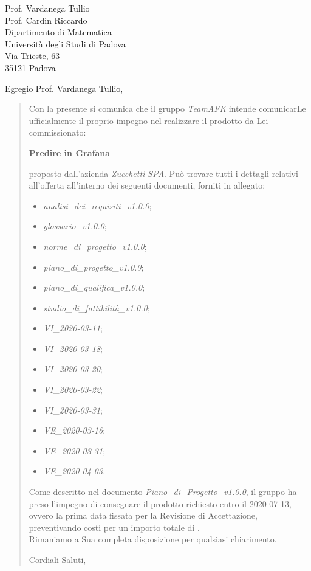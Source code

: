 \begin{letter}{
		Prof. Vardanega Tullio \\
		Prof. Cardin Riccardo \\
		Dipartimento di Matematica \\
		Università degli Studi di Padova \\
		Via Trieste, 63 \\
		35121 Padova}
		
\opening{Egregio Prof. Vardanega Tullio,}

\begin{quotation}
Con la presente si comunica che il gruppo \textit{TeamAFK} intende 
comunicarLe ufficialmente il proprio impegno nel realizzare il prodotto da Lei 
commissionato:

\begin{center}
	\textbf{Predire in Grafana}
\end{center}

\noindent proposto dall'azienda \textit{Zucchetti SPA}.
Può trovare tutti i dettagli relativi all'offerta all'interno dei seguenti 
documenti, forniti in allegato:

\begin{itemize}
	\item \textit{analisi\_dei\_requisiti\_v1.0.0};
	
	\item \textit{glossario\_v1.0.0};
	
	\item \textit{norme\_di\_progetto\_v1.0.0};

	\item \textit{piano\_di\_progetto\_v1.0.0};

	\item \textit{piano\_di\_qualifica\_v1.0.0};

	\item \textit{studio\_di\_fattibilità\_v1.0.0};

	\item \textit{VI\_2020-03-11};
	\item \textit{VI\_2020-03-18};
	\item \textit{VI\_2020-03-20};
	\item \textit{VI\_2020-03-22};
	\item \textit{VI\_2020-03-31};
	\item \textit{VE\_2020-03-16};
	\item \textit{VE\_2020-03-31};
	\item \textit{VE\_2020-04-03}.
\end{itemize}

\noindent Come descritto nel documento \textit{Piano\_di\_Progetto\_v1.0.0}, il gruppo ha preso l'impegno di consegnare il prodotto richiesto entro il 2020-07-13, ovvero la prima data fissata per la Revisione di Accettazione, preventivando costi per un importo 
totale di \textbf{}.\\
Rimaniamo a Sua completa disposizione per qualsiasi chiarimento.

\vspace{0.5cm}
\closing{ Cordiali Saluti,}
	

\end{quotation}
		
\end{letter}